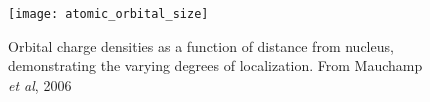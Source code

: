 \begin{figure}
	\centering
	\texttt{[image: atomic\_orbital\_size]}
	\caption{Orbital charge densities as a function of distance from nucleus, demonstrating the varying degrees of localization.  From Mauchamp \textit{et al}, 2006 \cite{mauchamp_ab_2006}}
	\label{orbital_size}
\end{figure}



